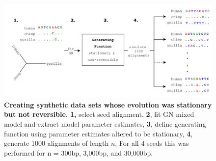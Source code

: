 \begin{figure}[htbp]
\centering
\includegraphics[width=\textwidth]{figures/diagrams/simulating_alns.pdf}
\caption[Creating synthetic data sets whose evolution was stationary but not reversible]{\textbf{Creating synthetic data sets whose evolution was stationary but not reversible.} \textbf{1,} select seed alignment, \textbf{2}, fit GN mixed model and extract model parameter estimates, \textbf{3}, define generating function using parameter estimates altered to be stationary, \textbf{4}, generate 1000 alignments of length $n$. For all 4 seeds this was performed for n = 300bp, 3,000bp, and 30,000bp.}
\label{fig:simulating_alns}
\end{figure}